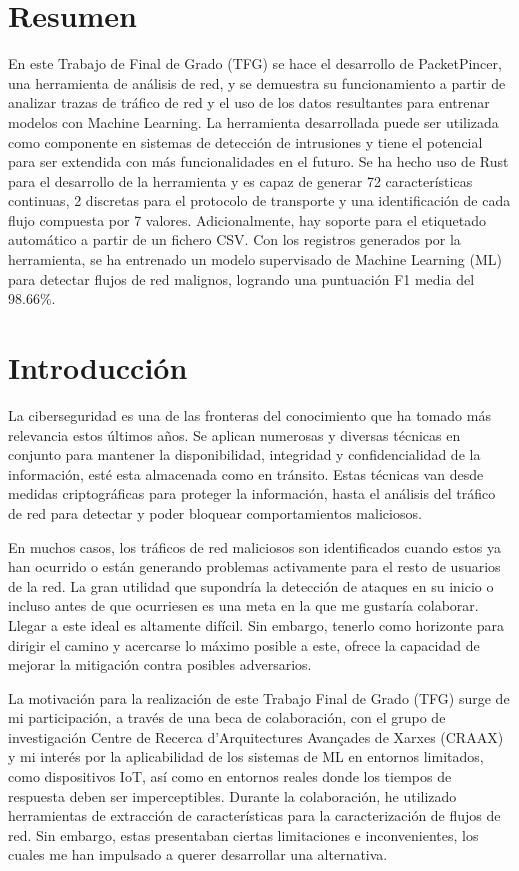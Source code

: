 \documentclass[10pt,a4paper,twoside]{article}
\begin{document}
\begin{multicols*}{2}
    \section*{Resumen}

    En este Trabajo de Final de Grado (TFG) se hace el desarrollo de PacketPincer, una herramienta de análisis de red, y se demuestra su funcionamiento a partir de analizar trazas de tráfico de red y el uso de los datos resultantes para entrenar modelos con Machine Learning. La herramienta desarrollada puede ser utilizada como componente en sistemas  de detección de intrusiones y tiene el potencial para ser extendida con más funcionalidades en el futuro. Se ha hecho uso de Rust para el desarrollo de la herramienta y es capaz de generar 72 características continuas, 2 discretas para el protocolo de transporte y una identificación de cada flujo compuesta por 7 valores. Adicionalmente, hay soporte para el etiquetado automático a partir de un fichero CSV. Con los registros generados por la herramienta, se ha entrenado un modelo supervisado de Machine Learning (ML) para detectar flujos de red malignos, logrando una puntuación F1 media del 98.66\%.

    \section{Introducción}
    
    La ciberseguridad es una de las fronteras del conocimiento que ha tomado más relevancia estos últimos años. Se aplican numerosas y diversas técnicas en conjunto para mantener la disponibilidad, integridad y confidencialidad de la información, esté esta almacenada como en tránsito. Estas técnicas van desde medidas criptográficas para proteger la información, hasta el análisis del tráfico de red para detectar y poder bloquear comportamientos maliciosos.

    En muchos casos, los tráficos de red maliciosos son identificados cuando estos ya han ocurrido o están generando problemas activamente para el resto de usuarios de la red. La gran utilidad que supondría la detección de ataques en su inicio o incluso antes de que ocurriesen es una meta en la que me gustaría colaborar. Llegar a este ideal es altamente difícil. Sin embargo, tenerlo como horizonte para dirigir el camino y acercarse lo máximo posible a este, ofrece la capacidad de mejorar la mitigación contra posibles adversarios.
    
    La motivación para la realización de este Trabajo Final de Grado (TFG) surge de mi participación, a través de una beca de colaboración, con el grupo de investigación Centre de Recerca d’Arquitectures Avançades de Xarxes (CRAAX) y mi interés por la aplicabilidad de los sistemas de ML en entornos limitados, como dispositivos IoT, así como en entornos reales donde los tiempos de respuesta deben ser imperceptibles. Durante la colaboración, he utilizado herramientas de extracción de características para la caracterización de flujos de red. Sin embargo, estas presentaban ciertas limitaciones e inconvenientes, los cuales me han impulsado a querer desarrollar una alternativa.


\end{multicols*}
\end{document}
